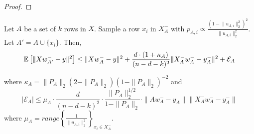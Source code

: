 \begin{proof}
\end{proof}


\begin{theorem}\label{theorem:chaining}
    Let $A$ be a set of $k$ rows in $X$. Sample a row $x_i$ in $X_A^-$ with $p_{A, i} \propto \frac{(1 - \lVert u_{A, i} \rVert_2^2)^2}{\lVert u_{A, i} \rVert_2^2}$. Let $A' = A \cup \{x_i\}$. Then,
   \begin{equation}
        \mathbb{E}\left[ \| Xw_{A'}^- - y \|^2 \right] \leq \| Xw_{A}^- - y \|^2 + {d \cdot (1 + \kappa_A)\over (n - d - k)^2} \| X_A^- w_A^- - y_A^- \|^2 + \mathcal{E}_A 
   \end{equation}
       
    where $\kappa_A = \| P_A \|_2 (2 - \| P_A \|_2) (1 - \| P_A \|_2)^{-2}$ and
    \begin{equation}
        | \mathcal{E}_A | \leq \mu_A \cdot \frac{d}{(n - d - k)^2} \cdot  
        \frac{\| P_A  \|_2^{1/2}}{1 - \| P_A \|_2} \cdot 
        \| A w_A^- - y_A \|   \|X_A^- w_A^- - y_A^- \|
    \end{equation}
      where $\mu_A = range \left\{\frac{1}{\lVert u_{A, i} \rVert_2^2} \right\}_{x_i \in X_A^-}$.
\end{theorem}



